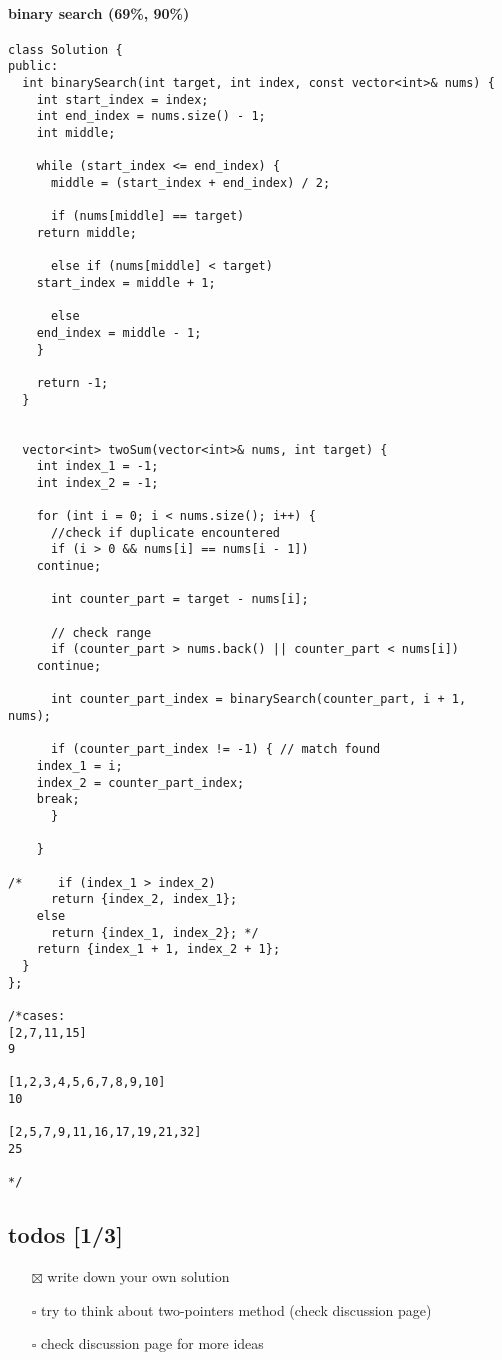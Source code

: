 \documentclass[12pt]{article}
\begin{document}
\paragraph{binary search (69\%, 90\%)}
\label{sec:org480d30f}
\begin{verbatim}
class Solution {
public:
  int binarySearch(int target, int index, const vector<int>& nums) {
    int start_index = index;
    int end_index = nums.size() - 1;
    int middle;

    while (start_index <= end_index) {
      middle = (start_index + end_index) / 2;

      if (nums[middle] == target)
	return middle;

      else if (nums[middle] < target)
	start_index = middle + 1;

      else
	end_index = middle - 1;
    }

    return -1;
  }


  vector<int> twoSum(vector<int>& nums, int target) {    
    int index_1 = -1;
    int index_2 = -1;

    for (int i = 0; i < nums.size(); i++) {
      //check if duplicate encountered
      if (i > 0 && nums[i] == nums[i - 1])
	continue;

      int counter_part = target - nums[i];

      // check range
      if (counter_part > nums.back() || counter_part < nums[i])
	continue;

      int counter_part_index = binarySearch(counter_part, i + 1, nums);

      if (counter_part_index != -1) { // match found
	index_1 = i;
	index_2 = counter_part_index;
	break;
      }     

    }

/*     if (index_1 > index_2)
      return {index_2, index_1};
    else
      return {index_1, index_2}; */
    return {index_1 + 1, index_2 + 1};
  }
};

/*cases: 
[2,7,11,15]
9

[1,2,3,4,5,6,7,8,9,10]
10

[2,5,7,9,11,16,17,19,21,32]
25

*/
\end{verbatim}
\subsection{todos [1/3]}
\label{sec:org61b9be1}
\begin{itemize}
\item[{$\boxtimes$}] write down your own solution
\item[{$\square$}] try to think about two-pointers method (check discussion page)
\item[{$\square$}] check discussion page for more ideas
\end{itemize}
\end{document}
